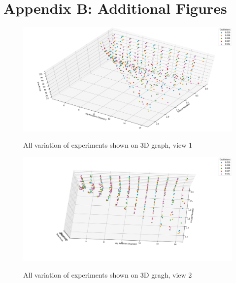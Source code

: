 \chapter{Appendix B: Additional Figures}


\begin{figure}[h!]
    \centering
    \includegraphics[width=1\textwidth]{figures/forcerotationfroude1.png}
    \label{froudenumbervsangle}
    \caption{All variation of experiments shown on 3D graph, view 1}
\end{figure}

\begin{figure}[h!]
    \centering
    \includegraphics[width=1\textwidth]{figures/forcerotationfroude2.png}
    \label{froudenumbervsangle}
    \caption{All variation of experiments shown on 3D gragh, view 2}
\end{figure}

